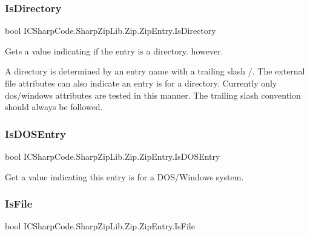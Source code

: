 \subsubsection{\texorpdfstring{Is\+Directory}{IsDirectory}}
{\footnotesize\ttfamily bool I\+C\+Sharp\+Code.\+Sharp\+Zip\+Lib.\+Zip.\+Zip\+Entry.\+Is\+Directory\hspace{0.3cm}{\ttfamily [get]}}



Gets a value indicating if the entry is a directory. however. 

A directory is determined by an entry name with a trailing slash \textquotesingle{}/\textquotesingle{}. The external file attributes can also indicate an entry is for a directory. Currently only dos/windows attributes are tested in this manner. The trailing slash convention should always be followed. \mbox{\label{class_i_c_sharp_code_1_1_sharp_zip_lib_1_1_zip_1_1_zip_entry_ab2dec1b6ce0357d6674ac9a62a4d050c}} 
\subsubsection{\texorpdfstring{Is\+D\+O\+S\+Entry}{IsDOSEntry}}
{\footnotesize\ttfamily bool I\+C\+Sharp\+Code.\+Sharp\+Zip\+Lib.\+Zip.\+Zip\+Entry.\+Is\+D\+O\+S\+Entry\hspace{0.3cm}{\ttfamily [get]}}



Get a value indicating this entry is for a D\+O\+S/\+Windows system. 

\mbox{\label{class_i_c_sharp_code_1_1_sharp_zip_lib_1_1_zip_1_1_zip_entry_a1a14b7a06b4757930176d2190955a2e3}} 
\subsubsection{\texorpdfstring{Is\+File}{IsFile}}
{\footnotesize\ttfamily bool I\+C\+Sharp\+Code.\+Sharp\+Zip\+Lib.\+Zip.\+Zip\+Entry.\+Is\+File\hspace{0.3cm}{\ttfamily [get]}}



